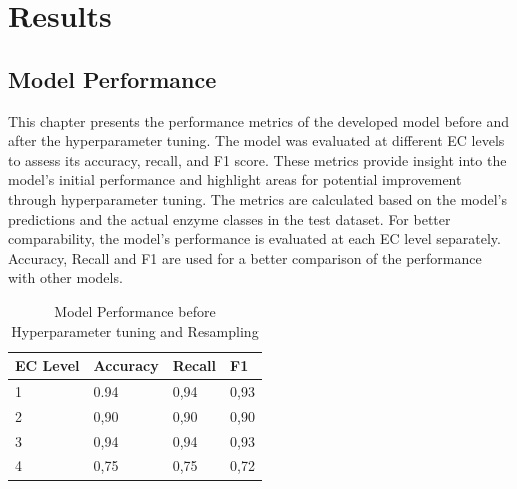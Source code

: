 \section{Results}

\subsection{Model Performance}
\label{sec:Model Performance}

This chapter presents the performance metrics of the developed model before and after the hyperparameter tuning. The model was evaluated at different EC levels to assess its accuracy, recall, and F1 score. These metrics provide insight into the model's initial performance and highlight areas for potential improvement through hyperparameter tuning. The metrics are calculated based on the model's predictions and the actual enzyme classes in the test dataset. For better comparability, the model's performance is evaluated at each EC level separately. Accuracy, Recall and F1 are used for a better comparison of the performance with other models.

\begin{table}[!htbp]
    \centering
    \begin{tabular}{@{}llll@{}}
    \toprule
    \textbf{EC Level} & \textbf{Accuracy} & \textbf{Recall} & \textbf{F1} \\ \midrule
    1                 & 0.94              & 0,94            & 0,93        \\
    2                 & 0,90              & 0,90            & 0,90        \\
    3                 & 0,94              & 0,94            & 0,93        \\
    4                 & 0,75              & 0,75            & 0,72        \\ \bottomrule
    \end{tabular}
    \caption{Model Performance before Hyperparameter tuning and Resampling}
    \label{tab:performance-before-tuning}
\end{table}

